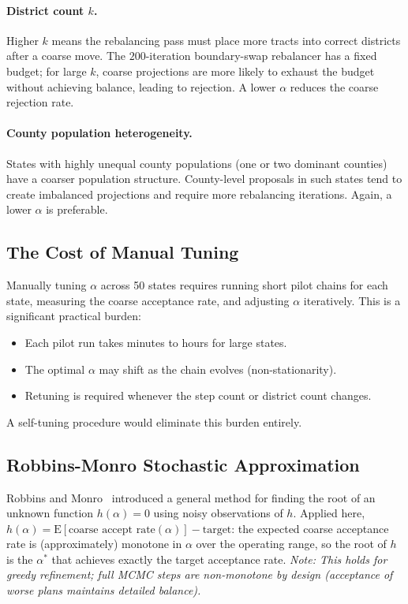 \paragraph{District count $k$.}
Higher $k$ means the rebalancing pass must place more tracts into correct
districts after a coarse move.
The $200$-iteration boundary-swap rebalancer has a fixed budget; for large
$k$, coarse projections are more likely to exhaust the budget without
achieving balance, leading to rejection.
A lower $\alpha$ reduces the coarse rejection rate.

\paragraph{County population heterogeneity.}
States with highly unequal county populations (one or two dominant counties)
have a coarser population structure.
County-level proposals in such states tend to create imbalanced projections
and require more rebalancing iterations.
Again, a lower $\alpha$ is preferable.

\subsection{The Cost of Manual Tuning}

Manually tuning $\alpha$ across 50 states requires running short pilot chains
for each state, measuring the coarse acceptance rate, and adjusting $\alpha$
iteratively.
This is a significant practical burden:
\begin{itemize}
  \item Each pilot run takes minutes to hours for large states.
  \item The optimal $\alpha$ may shift as the chain evolves (non-stationarity).
  \item Retuning is required whenever the step count or district count changes.
\end{itemize}
A self-tuning procedure would eliminate this burden entirely.

\subsection{Robbins-Monro Stochastic Approximation}

Robbins and Monro~\citeyear{robbins1951} introduced a general method for
finding the root of an unknown function $h(\alpha) = 0$ using noisy
observations of $h$.
Applied here, $h(\alpha) = \mathrm{E}[\text{coarse accept rate}(\alpha)] - \text{target}$:
the expected coarse acceptance rate is (approximately) monotone in $\alpha$
over the operating range, so the root of $h$ is the $\alpha^*$ that achieves
exactly the target acceptance rate.
\textit{Note: This holds for greedy refinement; full MCMC steps are
non-monotone by design (acceptance of worse plans maintains detailed balance).}


